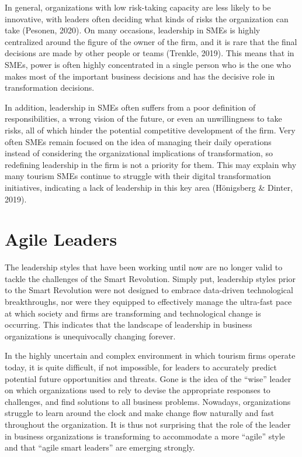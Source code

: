 \documentclass[
  letterpaper,
  DIV=11,
  numbers=noendperiod]{scrreprt}
\begin{document}
In general, organizations with low risk-taking capacity are less likely
to be innovative, with leaders often deciding what kinds of risks the
organization can take (Pesonen, 2020). On many occasions, leadership in
SMEs is highly centralized around the figure of the owner of the firm,
and it is rare that the final decisions are made by other people or
teams (Trenkle, 2019). This means that in SMEs, power is often highly
concentrated in a single person who is the one who makes most of the
important business decisions and has the decisive role in transformation
decisions.

In addition, leadership in SMEs often suffers from a poor definition of
responsibilities, a wrong vision of the future, or even an unwillingness
to take risks, all of which hinder the potential competitive development
of the firm. Very often SMEs remain focused on the idea of managing
their daily operations instead of considering the organizational
implications of transformation, so redefining leadership in the firm is
not a priority for them. This may explain why many tourism SMEs continue
to struggle with their digital transformation initiatives, indicating a
lack of leadership in this key area (Hönigsberg \& Dinter, 2019).

\hypertarget{agile-leaders}{%
\section{Agile Leaders}\label{agile-leaders}}

The leadership styles that have been working until now are no longer
valid to tackle the challenges of the Smart Revolution. Simply put,
leadership styles prior to the Smart Revolution were not designed to
embrace data-driven technological breakthroughs, nor were they equipped
to effectively manage the ultra-fast pace at which society and firms are
transforming and technological change is occurring. This indicates that
the landscape of leadership in business organizations is unequivocally
changing forever.

In the highly uncertain and complex environment in which tourism firms
operate today, it is quite difficult, if not impossible, for leaders to
accurately predict potential future opportunities and threats. Gone is
the idea of the ``wise'' leader on which organizations used to rely to
devise the appropriate responses to challenges, and find solutions to
all business problems. Nowadays, organizations struggle to learn around
the clock and make change flow naturally and fast throughout the
organization. It is thus not surprising that the role of the leader in
business organizations is transforming to accommodate a more ``agile''
style and that ``agile smart leaders'' are emerging strongly.
\end{document}
